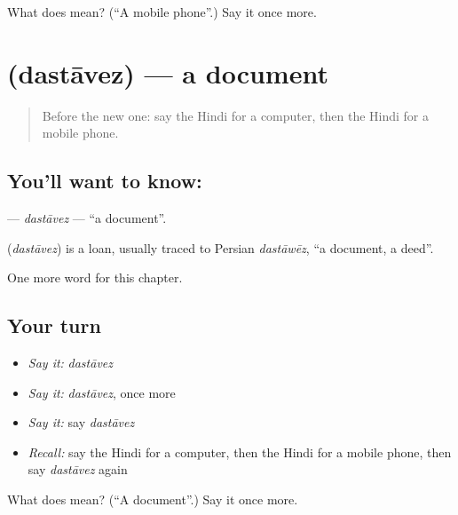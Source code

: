 \begin{tcolorbox}[breakable,colback=teal!4,colframe=teal!35!black,title={Before you move on}]
What does  mean? (\textquotedblleft{}A mobile phone\textquotedblright{}.) Say it once more.
\end{tcolorbox}
\section[\texorpdfstring{\hi{दस्तावेज़} (dastāvez)}{दस्तावेज़ (dastāvez)}]{ (dastāvez) — a document}

\label{lesson:HI-C249-dastavez}



\begin{quote}
Before the new one: say the Hindi for a computer, then the Hindi for a mobile phone.
\end{quote}

\subsection*{You'll want to know: }
\textbf{} — \emph{dastāvez} — \textquotedblleft{}a document\textquotedblright{}.

\begin{cousinweb}
\textbf{} (\emph{dastāvez}) is a loan, usually traced to Persian \emph{dastāwēz}, \textquotedblleft{}a document, a deed\textquotedblright{}.
\end{cousinweb}

\begin{grammarlens}[title={What you've built}]
One more word for this chapter.
\end{grammarlens}

\subsection*{Your turn}
\begin{itemize}
\raggedright
  \item \emph{Say it:} \emph{dastāvez}
  \item \emph{Say it:} \emph{dastāvez}, once more
  \item \emph{Say it:} say \emph{dastāvez}
  \item \emph{Recall:} say the Hindi for a computer, then the Hindi for a mobile phone, then say \emph{dastāvez} again
\end{itemize}

\begin{tcolorbox}[breakable,colback=teal!4,colframe=teal!35!black,title={Before you move on}]
What does  mean? (\textquotedblleft{}A document\textquotedblright{}.) Say it once more.
\end{tcolorbox}
